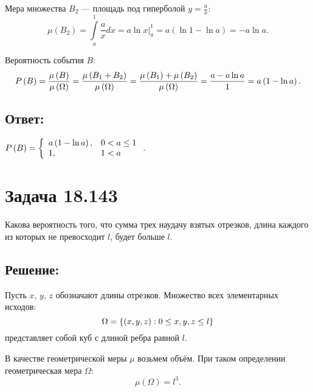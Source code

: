 \begin{enumerate}
    Мера множества $B_2$ --- площадь под гиперболой $y = \frac{a}{x}$:
    \begin{equation}
        \mu \left ( B_2 \right )
        = \int \limits_{a}^1 \frac{a}{x} dx
        = \left . a \ln x \right |_a^1
        = a \left ( \ln 1 - \ln a \right )
        = - a \ln a .
    \end{equation}

    Вероятность события $B$:
    \begin{equation}
        P \left ( B \right )
        = \frac{\mu \left ( B \right )}{\mu \left ( \Omega \right )}
        = \frac{\mu \left ( B_1 + B_2 \right )}{\mu \left ( \Omega \right )}
        = \frac{\mu \left ( B_1 \right ) + \mu \left ( B_2 \right )}{\mu \left ( \Omega \right )}
        = \frac{a - a \ln a}{1}
        = a \left ( 1 - \ln a \right ).
    \end{equation}
\end{enumerate}

\subsection*{Ответ:}
$
P \left ( B \right ) =
\left \{
\begin{array}{ll}
    a \left ( 1 - \ln a \right ), & 0 < a \le 1 \\
    1,                            & 1 < a
\end{array}
\right .
.
$

\section*{Задача 18.143}

Какова вероятность того, что сумма трех наудачу взятых отрезков, длина каждого из которых не превосходит $l$, будет больше $l$.

\subsection*{Решение:}

Пусть $x$, $y$, $z$ обозначают длины отрезков. Множество всех элементарных исходов:
\begin{equation}
    \Omega = \left \{ (x, y, z) : 0 \le x, y, z \le l \right \}
\end{equation}
представляет собой куб с длиной ребра равной $l$.

В качестве геометрической меры $\mu$ возьмем объём. При таком определении геометрическая мера $\Omega$:
\begin{equation}
    \mu \left ( \Omega \right ) = l^3.
\end{equation}

